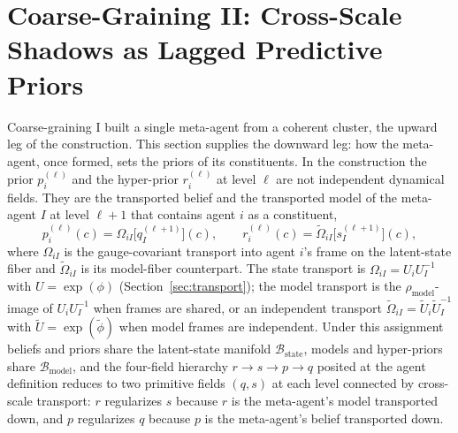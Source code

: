 \section{Coarse-Graining II: Cross-Scale Shadows as Lagged Predictive Priors}\label{sec:cross_scale_shadows}

Coarse-graining I built a single meta-agent from a coherent cluster, the upward leg of the construction. This section supplies the downward leg: how the meta-agent, once formed, sets the priors of its constituents. In the construction the prior $p_i^{(\ell)}$ and the hyper-prior $r_i^{(\ell)}$ at level $\ell$ are not independent dynamical fields. They are the transported belief and the transported model of the meta-agent $I$ at level $\ell+1$ that contains agent $i$ as a constituent,
\begin{equation}
p_i^{(\ell)}(c) = \Omega_{iI}\big[q_I^{(\ell+1)}\big](c),
\qquad
r_i^{(\ell)}(c) = \tilde\Omega_{iI}\big[s_I^{(\ell+1)}\big](c),
\label{eq:cross_scale_shadow}
\end{equation}
where $\Omega_{iI}$ is the gauge-covariant transport into agent $i$'s frame on the latent-state fiber and $\tilde\Omega_{iI}$ is its model-fiber counterpart. The state transport is $\Omega_{iI} = U_i U_I^{-1}$ with $U = \exp(\phi)$ (Section~\ref{sec:transport}); the model transport is the $\rho_{\mathrm{model}}$-image of $U_i U_I^{-1}$ when frames are shared, or an independent transport $\tilde\Omega_{iI} = \tilde U_i \tilde U_I^{-1}$ with $\tilde U = \exp(\tilde\phi)$ when model frames are independent. Under this assignment beliefs and priors share the latent-state manifold $\mathcal{B}_{\mathrm{state}}$, models and hyper-priors share $\mathcal{B}_{\mathrm{model}}$, and the four-field hierarchy $r \to s \to p \to q$ posited at the agent definition reduces to two primitive fields $(q, s)$ at each level connected by cross-scale transport: $r$ regularizes $s$ because $r$ is the meta-agent's model transported down, and $p$ regularizes $q$ because $p$ is the meta-agent's belief transported down.

